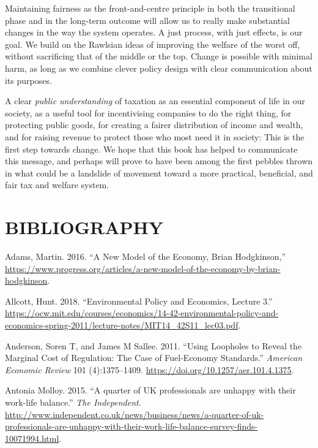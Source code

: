 \documentclass[]{tufte-handout}
\begin{document}
Maintaining fairness as the front-and-centre principle in both the
transitional phase and in the long-term outcome will allow us to really
make substantial changes in the way the system operates. A just process,
with just effects, is our goal. We build on the Rawlsian ideas of
improving the welfare of the worst off, without sacrificing that of the
middle or the top. Change is possible with minimal harm, as long as we
combine clever policy design with clear communication about its
purposes.

A clear \emph{public understanding} of taxation as an essential
component of life in our society, as a useful tool for incentivising
companies to do the right thing, for protecting public goods, for
creating a fairer distribution of income and wealth, and for raising
revenue to protect those who most need it in society: This is the first
step towards change. We hope that this book has helped to communicate
this message, and perhaps will prove to have been among the first
pebbles thrown in what could be a landslide of movement toward a more
practical, beneficial, and fair tax and welfare system.

\hypertarget{bibliography}{%
\section*{BIBLIOGRAPHY}\label{bibliography}}

\hypertarget{refs}{}
\leavevmode\hypertarget{ref-Adams2016}{}%
Adams, Martin. 2016. ``A New Model of the Economy, Brian Hodgkinson,''
\url{https://www.progress.org/articles/a-new-model-of-the-economy-by-brian-hodgkinson}.

\leavevmode\hypertarget{ref-Allcott2018}{}%
Allcott, Hunt. 2018. ``Environmental Policy and Economics, Lecture 3.''
\url{https://ocw.mit.edu/courses/economics/14-42-environmental-policy-and-economics-spring-2011/lecture-notes/MIT14_42S11_lec03.pdf}.

\leavevmode\hypertarget{ref-Anderson2011}{}%
Anderson, Soren T, and James M Sallee. 2011. ``Using Loopholes to Reveal
the Marginal Cost of Regulation: The Case of Fuel-Economy Standards.''
\emph{American Economic Review} 101 (4):1375--1409.
\url{https://doi.org/10.1257/aer.101.4.1375}.

\leavevmode\hypertarget{ref-AntoniaMolloy2015}{}%
Antonia Molloy. 2015. ``A quarter of UK professionals are unhappy with
their work-life balance.'' \emph{The Independent}.
\url{http://www.independent.co.uk/news/business/news/a-quarter-of-uk-professionals-are-unhappy-with-their-work-life-balance-survey-finds-10071994.html}.
\end{document}
